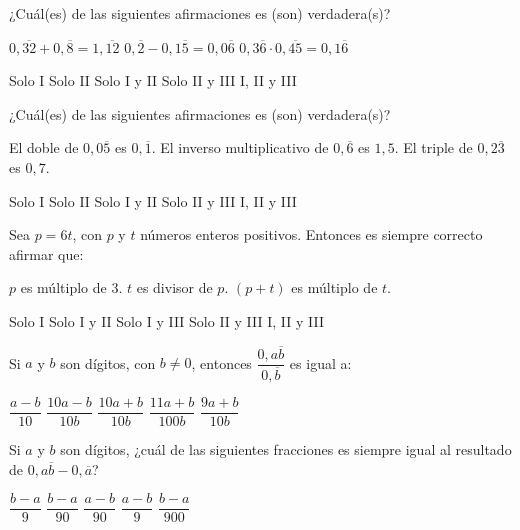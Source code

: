 \documentclass[pagina vacia]{srs}
\begin{document}
\begin{preguntas}[after-item-skip=1cm]
\pregunta ¿Cuál(es) de las siguientes afirmaciones es (son) verdadera(s)?
\begin{verticali}
\alternativa \( 0,\overline{32} + 0,\overline{8} = 1,\overline{12} \)
\alternativa \( 0,\overline{2} - 0,1\overline{5} = 0,0\overline{6} \)
\alternativa \( 0,3\overline{6} \cdot 0,\overline{45} = 0,1\overline{6} \)
\end{verticali}
\begin{vertical}
\alternativa Solo I
\alternativa Solo II
\alternativa Solo I y II
\alternativa Solo II y III
\alternativa I, II y III
\end{vertical}

\pregunta ¿Cuál(es) de las siguientes afirmaciones es (son) verdadera(s)?
\begin{verticali}
\alternativa El doble de $0,0\overline{5}$ es $0,\overline{1}$.
\alternativa El inverso multiplicativo de \(0,\overline{6}\) es $1,5$.
\alternativa El triple de \(0,2\overline{3}\) es $0,7$.
\end{verticali}
\begin{vertical}
\alternativa Solo I
\alternativa Solo II
\alternativa Solo I y II
\alternativa Solo II y III
\alternativa I, II y III
\end{vertical}

\pregunta Sea $p = 6t$, con $p$ y $t$ números enteros positivos. Entonces es siempre correcto afirmar que:
\begin{verticali}
\alternativa $p$ es múltiplo de 3.
\alternativa $t$ es divisor de $p$.
\alternativa $(p + t)$ es múltiplo de $t$.
\end{verticali}
\begin{vertical}
\alternativa Solo I
\alternativa Solo I y II
\alternativa Solo I y III
\alternativa Solo II y III
\alternativa I, II y III
\end{vertical}

\pregunta Si $a$ y $b$ son dígitos, con \(b \neq 0\), entonces \( \dfrac{0,a\overline{b}}{0,\overline{b}} \) es igual a:
\begin{vertical}
\alternativa \( \dfrac{a - b}{10} \)
\alternativa \( \dfrac{10a - b}{10b} \)
\alternativa \( \dfrac{10a + b}{10b} \)
\alternativa \( \dfrac{11a + b}{100b} \)
\alternativa \( \dfrac{9a + b}{10b} \)
\end{vertical}

\pregunta Si $a$ y $b$ son dígitos, ¿cuál de las siguientes fracciones es siempre igual al resultado de \(0,a\overline{b} - 0,\overline{a}\)?
\begin{vertical}
\alternativa \( \dfrac{b - a}{9} \)
\alternativa \( \dfrac{b - a}{90} \)
\alternativa \( \dfrac{a - b}{90} \)
\alternativa \( \dfrac{a - b}{9} \)
\alternativa \( \dfrac{b - a}{900} \)
\end{vertical}


\end{preguntas}
\end{document}

